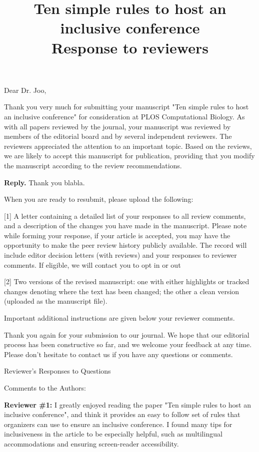\documentclass{article}
\title{Ten simple rules to host an inclusive conference\\ \vspace{0.5cm}
\textbf{Response to reviewers}}
\author{}
\date{}
\newenvironment{Reply}{\noindent\color{BlueViolet}\textbf{Reply.}}{\vspace{1em}}
\begin{document}
\maketitle

Dear Dr. Joo,

Thank you very much for submitting your manuscript "Ten simple rules to host an inclusive conference" for consideration at PLOS Computational Biology. As with all papers reviewed by the journal, your manuscript was reviewed by members of the editorial board and by several independent reviewers. The reviewers appreciated the attention to an important topic. Based on the reviews, we are likely to accept this manuscript for publication, providing that you modify the manuscript according to the review recommendations.

\begin{Reply}
    Thank you blabla.
\end{Reply}

When you are ready to resubmit, please upload the following:


[1] A letter containing a detailed list of your responses to all review comments, and a description of the changes you have made in the manuscript. Please note while forming your response, if your article is accepted, you may have the opportunity to make the peer review history publicly available. The record will include editor decision letters (with reviews) and your responses to reviewer comments. If eligible, we will contact you to opt in or out

[2] Two versions of the revised manuscript: one with either highlights or tracked changes denoting where the text has been changed; the other a clean version (uploaded as the manuscript file).

Important additional instructions are given below your reviewer comments.

 Thank you again for your submission to our journal. We hope that our editorial process has been constructive so far, and we welcome your feedback at any time. Please don't hesitate to contact us if you have any questions or comments.



Reviewer's Responses to Questions

Comments to the Authors:

\textbf{Reviewer \#1:}
I greatly enjoyed reading the paper "Ten simple rules to host an inclusive conference", and think it provides an easy to follow set of rules that organizers can use to ensure an inclusive conference. I found many tips for inclusiveness in the article to be especially helpful, such as multilingual accommodations and ensuring screen-reader accessibility.
\end{document}
